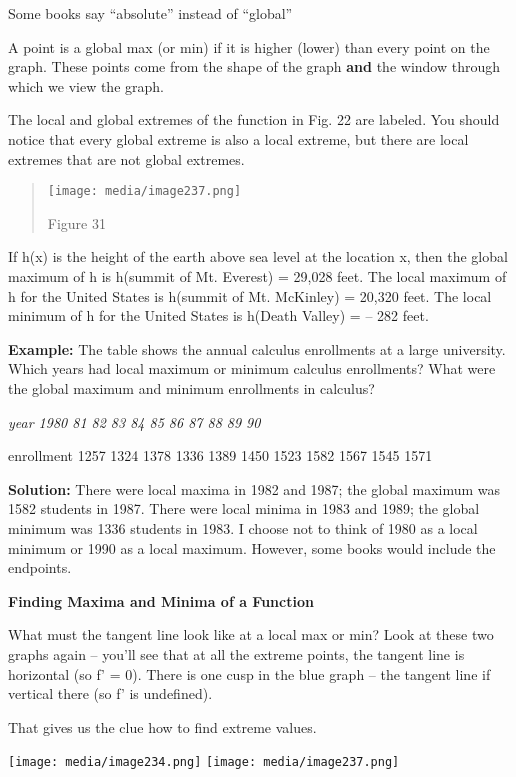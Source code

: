 Some books say ``absolute'' instead of ``global''

A point is a global max (or min) if it is higher (lower) than every
point on the graph. These points come from the shape of the graph
\textbf{and} the window through which we view the graph.

The local and global extremes of the function in Fig. 22 are labeled.
You should notice that every global extreme is also a local extreme, but
there are local extremes that are not global extremes.

\begin{quote}
\texttt{[image: media/image237.png]}

Figure 31
\end{quote}

If h(x) is the height of the earth above sea level at the location x,
then the global maximum of h is h(summit of Mt. Everest) = 29,028 feet.
The local maximum of h for the United States is h(summit of Mt.
McKinley) = 20,320 feet. The local minimum of h for the United States is
h(Death Valley) = -- 282 feet.

\textbf{Example:} The table shows the annual calculus enrollments at a
large university. Which years had local maximum or minimum calculus
enrollments? What were the global maximum and minimum enrollments in
calculus?

\emph{year 1980 81 82 83 84 85 86 87 88 89 90~~}

enrollment 1257 1324 1378 1336 1389 1450 1523 1582 1567 1545 1571

\textbf{Solution:} There were local maxima in 1982 and 1987; the global
maximum was 1582 students in 1987. There were local minima in 1983 and
1989; the global minimum was 1336 students in 1983. I choose not to
think of 1980 as a local minimum or 1990 as a local maximum. However,
some books would include the endpoints.

\textbf{Finding Maxima and Minima of a Function}

What must the tangent line look like at a local max or min? Look at
these two graphs again -- you'll see that at all the extreme points, the
tangent line is horizontal (so f' = 0). There is one cusp in the blue
graph -- the tangent line if vertical there (so f' is undefined).

That gives us the clue how to find extreme values.

\texttt{[image: media/image234.png]}
\texttt{[image: media/image237.png]}

